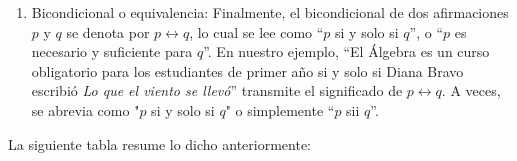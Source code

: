 \begin{enumerate}
\begin{enumerate}
        \begin{tasks}[label=\roman*)](2)
            \task “Si $p$, entonces $q$”.
            \task “$p$ es suficiente para $q$”.
            \task*(2) “$p$ es una condición suficiente para $q$”.
            \task*(2) “$q$ es una condición necesaria para $p$”.
            \task “$q$ es necesario para $p$”.
            \task “$p$ solo si $q$”.
        \end{tasks}
        Una traducción verbal de $p \rightarrow q$ en nuestro ejemplo sería: “Si el Álgebra es un curso obligatorio para los estudiantes de primer año, entonces Diana Bravo escribió \emph{Lo que el viento se llevó}”. La afirmación $p$ se denomina la hipótesis de la implicación; $q$ se denomina la conclusión. Cuando se combinan afirmaciones de esta manera, no es necesario que exista una relación causal entre ellas para que la implicación sea verdadera.\newpage
        \item Bicondicional o equivalencia: Finalmente, el bicondicional de dos afirmaciones $p$ y $q$ se denota por $p \leftrightarrow q$, lo cual se lee como “$p$ si y solo si $q$”, o “$p$ es necesario y suficiente para $q$”. En nuestro ejemplo, “El Álgebra es un curso obligatorio para los estudiantes de primer año si y solo si Diana Bravo escribió \emph{Lo que el viento se llevó}” transmite el significado de $p \leftrightarrow q$. A veces, se abrevia como "$p$ si y solo si $q$" o simplemente “$p$ sii $q$”.
    \end{enumerate}
\end{enumerate}
La siguiente tabla resume lo dicho anteriormente:
